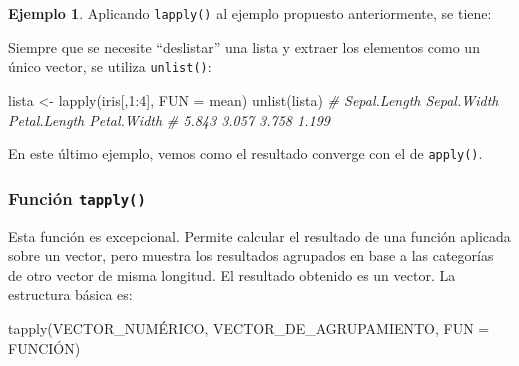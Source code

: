 \documentclass[
]{article}
\newenvironment{Shaded}{\begin{snugshade}}{\end{snugshade}}
\newcommand{\AttributeTok}[1]{\textcolor[rgb]{0.77,0.63,0.00}{#1}}
\newcommand{\CommentTok}[1]{\textcolor[rgb]{0.56,0.35,0.01}{\textit{#1}}}
\newcommand{\DecValTok}[1]{\textcolor[rgb]{0.00,0.00,0.81}{#1}}
\newcommand{\FunctionTok}[1]{\textcolor[rgb]{0.00,0.00,0.00}{#1}}
\newcommand{\NormalTok}[1]{#1}
\newcommand{\OtherTok}[1]{\textcolor[rgb]{0.56,0.35,0.01}{#1}}
\newcommand{\SpecialCharTok}[1]{\textcolor[rgb]{0.00,0.00,0.00}{#1}}
\theoremstyle{definition}
\theoremstyle{definition}
\newtheorem{example}{Ejemplo}[section]
\theoremstyle{definition}
\theoremstyle{definition}
\theoremstyle{remark}
\begin{document}
\begin{example}

Aplicando \texttt{lapply()} al ejemplo propuesto anteriormente, se tiene:

\begin{Shaded}
\end{Shaded}

Siempre que se necesite ``deslistar'' una lista y extraer los elementos como un único vector, se utiliza \texttt{unlist()}:

\begin{Shaded}
\begin{Highlighting}[]
\NormalTok{lista }\OtherTok{\textless{}{-}} \FunctionTok{lapply}\NormalTok{(iris[,}\DecValTok{1}\SpecialCharTok{:}\DecValTok{4}\NormalTok{],  }\AttributeTok{FUN =}\NormalTok{ mean)}
\FunctionTok{unlist}\NormalTok{(lista)}
\CommentTok{\# Sepal.Length  Sepal.Width Petal.Length  Petal.Width }
\CommentTok{\#        5.843        3.057        3.758        1.199}
\end{Highlighting}
\end{Shaded}

\end{example}

En este último ejemplo, vemos como el resultado converge con el de \texttt{apply()}.

\hypertarget{funciuxf3n-tapply}{%
\subsubsection{\texorpdfstring{Función \texttt{tapply()}}{Función tapply()}}\label{funciuxf3n-tapply}}

Esta función es excepcional. Permite calcular el resultado de una función aplicada sobre un vector, pero muestra los resultados agrupados en base a las categorías de otro vector de misma longitud. El resultado obtenido es un vector. La estructura básica es:

\begin{Shaded}
\begin{Highlighting}[]
\FunctionTok{tapply}\NormalTok{(VECTOR\_NUMÉRICO, VECTOR\_DE\_AGRUPAMIENTO, }\AttributeTok{FUN =}\NormalTok{ FUNCIÓN)}
\end{Highlighting}
\end{Shaded}
\end{document}

